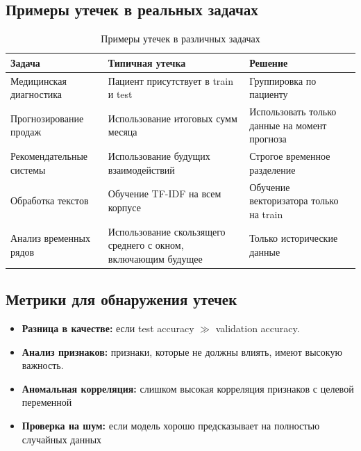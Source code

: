 \subsection*{Примеры утечек в реальных задачах}

\begin{table}[h]
    \centering
    \begin{tabular}{|p{}|p{}|p{}|}
        \hline
        \textbf{Задача}          & \textbf{Типичная утечка}                                       & \textbf{Решение}                              \\\hline
        Медицинская диагностика  & Пациент присутствует в train и test                            & Группировка по пациенту                       \\\hline
        Прогнозирование продаж   & Использование итоговых сумм месяца                             & Использовать только данные на момент прогноза \\\hline
        Рекомендательные системы & Использование будущих взаимодействий                           & Строгое временное разделение                  \\\hline
        Обработка текстов        & Обучение TF-IDF на всем корпусе                                & Обучение векторизатора только на train        \\\hline
        Анализ временных рядов   & Использование скользящего среднего с окном, включающим будущее & Только исторические данные \\\hline
    \end{tabular}
    \caption{Примеры утечек в различных задачах}
    \label{tab:leaks}
\end{table}

\subsection*{Метрики для обнаружения утечек}

\begin{itemize}
    \item \textbf{Разница в качестве:} если test accuracy $\gg$ validation accuracy.
    \item \textbf{Анализ признаков:} признаки, которые не должны влиять, имеют высокую важность.
    \item \textbf{Аномальная корреляция:} слишком высокая корреляция признаков с целевой переменной
    \item \textbf{Проверка на шум:} если модель хорошо предсказывает на полностью случайных данных
\end{itemize}

